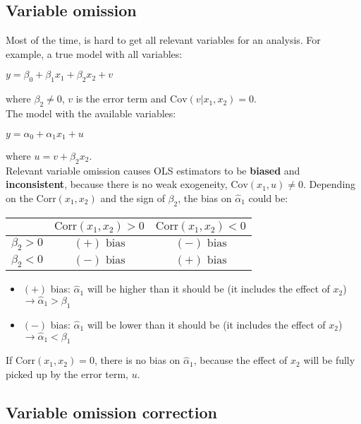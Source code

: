 \documentclass[10pt, a4paper, landscape]{extarticle}
\newcommand{\Cov}{\mathrm{Cov}}
\newcommand{\Corr}{\mathrm{Corr}}
\begin{document}
\begin{multicols}{3}
\section*{Variable omission}
	Most of the time, is hard to get all relevant variables for an analysis. For example, a true model with all variables:
	\begin{center}
		$y = \beta_0 + \beta_1 x_1 + \beta_2 x_2 + v$
	\end{center}
	\quad where $\beta_2 \neq 0$, $v$ is the error term and $\Cov(v|x_1,x_2) = 0$. \\
	The model with the available variables:
	\begin{center}
		$y = \alpha_0 + \alpha_1 x_1 + u$
	\end{center}
	\quad where $u = v + \beta_2 x_2$. \\
	Relevant variable omission causes OLS estimators to be \textbf{biased} and \textbf{inconsistent}, because there is no weak exogeneity, $\Cov(x_1,u) \neq 0$. Depending on the $\Corr(x_1, x_2)$ and the sign of $\beta_2$, the bias on $\hat{\alpha}_1$ could be:
	\begin{center}
		\begin{tabular}{| c | c | c |}
			\cline{2-3}
			\multicolumn{1}{c|}{} & $\Corr(x_1, x_2) > 0$ & $\Corr(x_1, x_2) < 0$ \\ \hline
			$\beta_2 > 0$         & $(+) \text{ bias}$    & $(-) \text{ bias}$    \\ \hline
			$\beta_2 < 0$         & $(-) \text{ bias}$    & $(+) \text{ bias}$    \\ \hline
		\end{tabular}
	\end{center}
	\begin{itemize}[leftmargin=*]
		\item $(+)$ bias: $\hat{\alpha}_1$ will be higher than it should be (it includes the effect of $x_2$) $\rightarrow \hat{\alpha}_1 > \beta_1$
		\item $(-)$ bias: $\hat{\alpha}_1$ will be lower than it should be (it includes the effect of $x_2$) $\rightarrow \hat{\alpha}_1 < \beta_1$
	\end{itemize}
	If $\Corr(x_1,x_2) = 0$, there is no bias on $\hat{\alpha}_1$, because the effect of $x_2$ will be fully picked up by the error term, $u$.
\columnbreak
	\subsection*{Variable omission correction}

\end{multicols}
\end{document}
